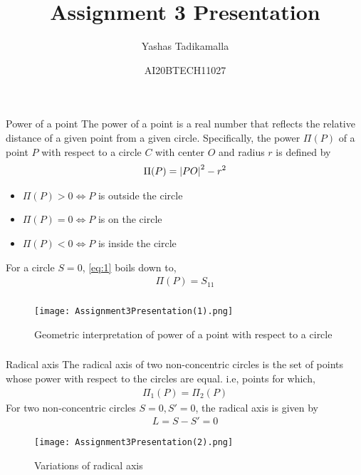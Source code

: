 \documentclass{beamer}
\title{Assignment 3 Presentation}
\author{Yashas Tadikamalla}
\date{AI20BTECH11027}
\begin{document}
\begin{frame}
\titlepage
\end{frame}

\begin{frame}
\frametitle{}
\begin{block}{Power of a point}
The power of a point is a real number that reflects the relative distance of a given point from a given circle. Specifically, the power $\Pi(P)$ of a point $P$ with respect to a circle $C$ with center $O$ and radius $r$ is defined by
\begin{align}
    \Pi(P)=\abs{PO}^{2}-r^{2}
    \label{eq:1}
\end{align}
\begin{itemize}
    \item $\Pi(P)>0\Leftrightarrow P$ is outside the circle
    \item $\Pi(P)=0\Leftrightarrow P$ is on the circle
    \item $\Pi(P)<0\Leftrightarrow P$ is inside the circle
\end{itemize}
For a circle $S=0$, \eqref{eq:1} boils down to,
\begin{align}
    \Pi(P)=S_{11}
    \label{eq:2}
\end{align}
\end{block}
\end{frame}

\begin{frame}
\frametitle{}
\begin{block}{}
\begin{figure}[!h]
 \centering
 \texttt{[image: Assignment3Presentation(1).png]}
 \caption{Geometric interpretation of power of a point with respect to a circle }
 \label{plot}
\end{figure}
\end{block}
\end{frame}

\begin{frame}
\frametitle{}
\begin{block}{Radical axis}
The radical axis of two non-concentric circles is the set of points whose power with respect to the circles are equal. i.e, points for which,
\begin{align}
    \Pi_{1}(P)=\Pi_{2}(P)
    \label{eq:3}
\end{align}
For two non-concentric circles $S=0,S'=0$, the radical axis is given by
\begin{align}
    L=S-S'=0
    \label{eq:4}
\end{align}
\begin{figure}[!h]
 \centering
 \texttt{[image: Assignment3Presentation(2).png]}
 \caption{Variations of radical axis}
 \label{plot}
\end{figure}
\end{block}
\end{frame}
\end{document}
